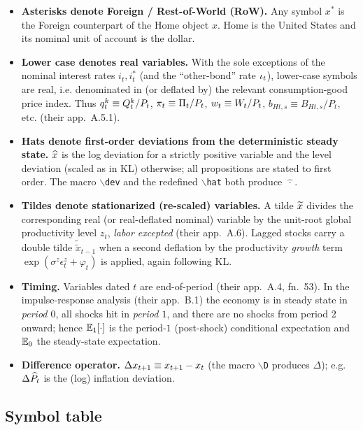 \begin{itemize}[leftmargin=1.4em,itemsep=2pt]
  \item \textbf{Asterisks denote Foreign / Rest-of-World (RoW).} Any symbol
  \(x^{*}\) is the Foreign counterpart of the Home object \(x\). Home is the
  United States and its nominal unit of account is the dollar.
  \item \textbf{Lower case denotes real variables.} With the sole exceptions of
  the nominal interest rates \(i_t,i_t^{*}\) (and the ``other-bond'' rate
  \(\iota_t\)), lower-case symbols are real, i.e. denominated in (or deflated
  by) the relevant consumption-good price index. Thus \(q^{k}_t\equiv Q^k_t/P_t\),
  \(\pi_t\equiv\Pi_t/P_t\), \(w_t\equiv W_t/P_t\), \(b_{Ht,s}\equiv
  B_{Ht,s}/P_t\), etc. (their app.\ A.5.1).
  \item \textbf{Hats denote first-order deviations from the deterministic steady
  state.} \(\widehat{x}\) is the log deviation for a strictly positive variable and
  the level deviation (scaled as in KL) otherwise; all propositions are stated
  to first order. The macro \(\backslash\)\texttt{dev} and the redefined
  \(\backslash\)\texttt{hat} both produce \(\widehat{\,\cdot\,}\).
  \item \textbf{Tildes denote stationarized (re-scaled) variables.} A tilde
  \(\widetilde{x}\) divides the corresponding real (or real-deflated nominal) variable
  by the unit-root global productivity level \(z_t\), \emph{labor excepted}
  (their app.\ A.6). Lagged stocks carry a double tilde
  \(\widetilde{\widetilde{x}}_{t-1}\) when a second deflation by the
  productivity \emph{growth} term \(\exp(\sigma^z\epsilon^z_t+\varphi_t)\) is
  applied, again following KL.
  \item \textbf{Timing.} Variables dated \(t\) are end-of-period
  (their app.\ A.4, fn.~53). In the impulse-response analysis (their app.\ B.1)
  the economy is in steady state in \emph{period \(0\)}, all shocks hit in
  \emph{period \(1\)}, and there are no shocks from period \(2\) onward; hence
  \(\mathbb{E}_1[\cdot]\) is the period-\(1\) (post-shock) conditional expectation and
  \(\mathbb{E}_0\) the steady-state expectation.
  \item \textbf{Difference operator.} \(\Delta x_{t+1}\equiv x_{t+1}-x_t\) (the
  macro \(\backslash\)\texttt{D} produces \(\Delta\)); e.g.\
  \(\Delta\widehat{P}_t\) is the (log) inflation deviation.
\end{itemize}

\subsection{Symbol table}

